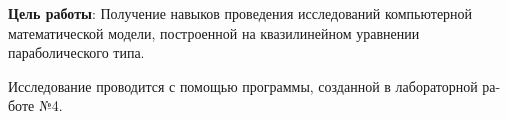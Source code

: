\textbf{Цель работы}: Получение навыков проведения исследований компьютерной математической модели, построенной на квазилинейном уравнении параболического типа.

Исследование проводится  с помощью программы, созданной в лабораторной ра-боте №4.
